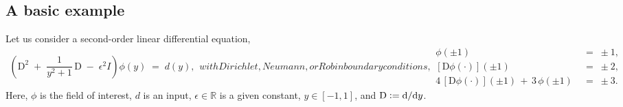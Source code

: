 \documentclass[%
secnumarabic,%
 amssymb, amsmath,%
 aps,prf,superscriptaddress,longbibliography
frontmatterverbose,
]{revtex4-2}
\newcommand{\DefinedAs}[0]{\mathrel{\mathop:}=}
\begin{document}
	\vspace*{-3ex}
	\subsection{A basic example}
	
		\vspace*{-2ex}
Let us consider a second-order linear differential equation,
\begin{subequations}
  \begin{align}
    \left( 
 \mathrm  D^{2} \; + \; \dfrac{1}{y^2 + 1} \, \mathrm D \; - \; \epsilon^2 I 
 \right) 
 \phi (y) 
 \; = \; 
 d(y),\label{eq:1}
  \end{align}  
  with Dirichlet, Neumann, or Robin boundary conditions,
  \begin{align}
    \phi (\pm 1) \;& =\;  \pm 1, \label{eq:1b}
    \\
  [{\mathrm  D} \phi (\cdot)](\pm 1) \;& =\; \pm 2, \label{eq:1c}
    \\
   4\,[{\mathrm  D} \phi (\cdot)](\pm 1)  \,+\, 3\,\phi (\pm 1) \;&=\; \pm 3. \label{eq:1d}
  \end{align}
\end{subequations}
Here, $\phi$ is the field of interest, $d$ is an input, $\epsilon \in \mathbb{R}$ is a given constant, $y \in [-1, 1]$, and $\D \DefinedAs \mathrm d / \mathrm dy$.
\end{document}
